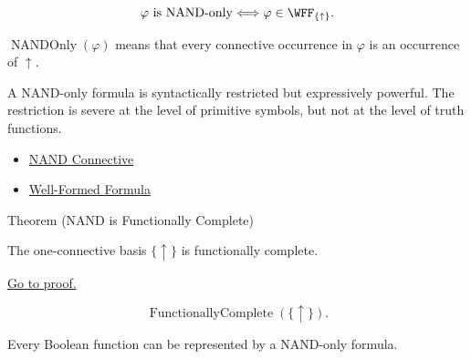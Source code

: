 \begin{remark*}
\[
\varphi\text{ is NAND-only}
\Longleftrightarrow
\varphi\in\WFF_{\{\uparrow\}}.
\]
\end{remark*}

\begin{remark*}
\(\operatorname{NANDOnly}(\varphi)\) means that every connective occurrence in
\(\varphi\) is an occurrence of \(\uparrow\).
\end{remark*}

\begin{remark*}[Interpretation]
A NAND-only formula is syntactically restricted but expressively powerful. The
restriction is severe at the level of primitive symbols, but not at the level of
truth functions.
\end{remark*}

\begin{dependencies}
\begin{itemize}
  \item \hyperref[def:nand-connective-propositional-logic]{NAND Connective}
  \item \hyperref[def:well-formed-formula]{Well-Formed Formula}
\end{itemize}
\end{dependencies}

\begin{theorembox}{Theorem (NAND is Functionally Complete)}
\begin{theorem}
\label{thm:nand-functionally-complete-propositional-logic}
The one-connective basis \(\{\uparrow\}\) is functionally complete.

\noindent\hyperref[prf:nand-functionally-complete-propositional-logic]{Go to proof.}
\end{theorem}
\end{theorembox}

\begin{remark*}
\[
\operatorname{FunctionallyComplete}(\{\uparrow\}).
\]
\end{remark*}

\begin{remark*}
Every Boolean function can be represented by a NAND-only formula.
\end{remark*}

